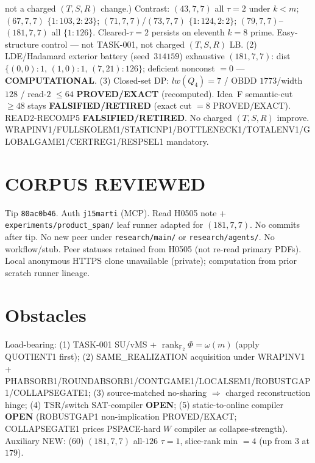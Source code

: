 \documentclass[11pt]{article}
\begin{document}
not a charged $(T,S,R)$ change.)
Contrast: $(43,7,7)$ all $\tau{=}2$ under $k{<}m$; $(67,7,7)$ $\{1{:}103,2{:}23\}$;
$(71,7,7)$/$(73,7,7)$ $\{1{:}124,2{:}2\}$; $(79,7,7)$--$(181,7,7)$ all $\{1{:}126\}$.
Cleared-$\tau{=}2$ persists on eleventh $k{=}8$ prime. Easy-structure control --- not TASK-001,
not charged $(T,S,R)$ LB.
(2) LDE/Hadamard exterior battery (seed~$314159$) exhaustive $(181,7,7)$:
dist $\{(0,0){:}1,\,(1,0){:}1,\,(7,21){:}126\}$; deficient nonconst $=0$ --- \textbf{COMPUTATIONAL}.
(3) Closed-set DP: $lw(Q_4)=7$ / OBDD $1773$/width $128$ / read-$2$ $\le64$
\textbf{PROVED/EXACT} (recomputed).
Idea~F semantic-cut $\ge48$ stays \textbf{FALSIFIED/RETIRED} (exact cut $=8$ PROVED/EXACT).
READ2-RECOMP5 \textbf{FALSIFIED/RETIRED}. No charged $(T,S,R)$ improve.
WRAPINV1/FULLSKOLEM1/STATICNP1/BOTTLENECK1/TOTALENV1/GLOBALGAME1/CERTREG1/RESPSEL1 mandatory.

\section*{CORPUS REVIEWED}
Tip \texttt{80ac0b46}. Auth \texttt{j15marti} (MCP). Read H0505 note +
\texttt{experiments/product\_span/} leaf runner adapted for $(181,7,7)$.
No commits after tip. No new peer under \texttt{research/main/} or \texttt{research/agents/}.
No workflow/stub. Peer statuses retained from H0505 (not re-read primary PDFs).
Local anonymous HTTPS clone unavailable (private); computation from prior scratch runner lineage.

\section*{Obstacles}
Load-bearing: (1) TASK-001 SU/vMS + $\operatorname{rank}_{\mathbb F_2}\Phi=\omega(m)$ (apply QUOTIENT1 first);
(2) SAME\_REALIZATION acquisition under WRAPINV1 + PHABSORB1/ROUNDABSORB1/CONTGAME1/LOCALSEM1/ROBUSTGAP1/COLLAPSEGATE1;
(3) source-matched no-sharing $\Rightarrow$ charged reconstruction hinge;
(4) TSR/switch SAT-compiler \textbf{OPEN};
(5) static-to-online compiler \textbf{OPEN} (ROBUSTGAP1 non-implication PROVED/EXACT;
COLLAPSEGATE1 prices PSPACE-hard $W$ compiler as collapse-strength).
Auxiliary NEW: (60) $(181,7,7)$ all-$126$ $\tau{=}1$, slice-rank min $=4$ (up from $3$ at $179$).
\end{document}
